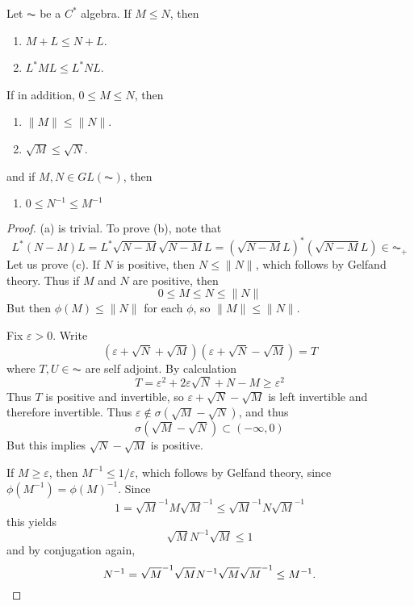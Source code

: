 \begin{prop}
    Let $\AC$ be a $C^*$ algebra. If $M \leq N$, then
    \begin{enumerate}
        \item[(a)] $M + L \leq N + L$.
        \item[(b)] $L^*ML \leq L^*NL$.
    \end{enumerate}
    If in addition, $0 \leq M \leq N$, then
    \begin{enumerate}
        \item[(c)] $\| M \| \leq \| N \|$.
        \item[(d)] $\sqrt{M} \leq \sqrt{N}$.
    \end{enumerate}
    and if $M, N \in GL(\AC)$, then
    \begin{enumerate}
        \item[(e)] $0 \leq N^{-1} \leq M^{-1}$
    \end{enumerate}
\end{prop}
\begin{proof}
    (a) is trivial. To prove (b), note that
    \[ L^*(N - M)L = L^*\sqrt{N - M}\sqrt{N - M}L = (\sqrt{N - M} L)^* (\sqrt{N - M} L) \in \AC_+ \]
    Let us prove (c). If $N$ is positive, then $N \leq \| N \|$, which follows by Gelfand theory. Thus if $M$ and $N$ are positive, then
    \[ 0 \leq M \leq N \leq \| N \| \]
    But then $\phi(M) \leq \| N \|$ for each $\phi$, so $\| M \| \leq \| N \|$.

    Fix $\varepsilon > 0$. Write
    \[ (\varepsilon + \sqrt{N} + \sqrt{M})(\varepsilon + \sqrt{N} - \sqrt{M}) = T \]
    where $T,U \in \AC$ are self adjoint. By calculation
    \[ T = \varepsilon^2 + 2 \varepsilon \sqrt{N} + N - M \geq \varepsilon^2 \]
    Thus $T$ is positive and invertible, so $\varepsilon + \sqrt{N} - \sqrt{M}$ is left invertible and therefore invertible. Thus $\varepsilon \not \in \sigma(\sqrt{M} - \sqrt{N})$, and thus
    \[ \sigma(\sqrt{M} - \sqrt{N}) \subset (-\infty, 0) \]
    But this implies $\sqrt{N} - \sqrt{M}$ is positive.

    If $M \geq \varepsilon$, then $M^{-1} \leq 1/\varepsilon$, which follows by Gelfand theory, since $\phi(M^{-1}) = \phi(M)^{-1}$. Since
    \[ 1 = \sqrt{M}^{-1}M\sqrt{M}^{-1} \leq \sqrt{M}^{-1} N \sqrt{M}^{-1} \]
    this yields
    \[ \sqrt{M} N^{-1} \sqrt{M} \leq 1 \]
    and by conjugation again,
    \[ N^{-1} = \sqrt{M}^{-1} \sqrt{M} N^{-1} \sqrt{M} \sqrt{M}^{-1} \leq M^{-1}. \qedhere \]
\end{proof}

